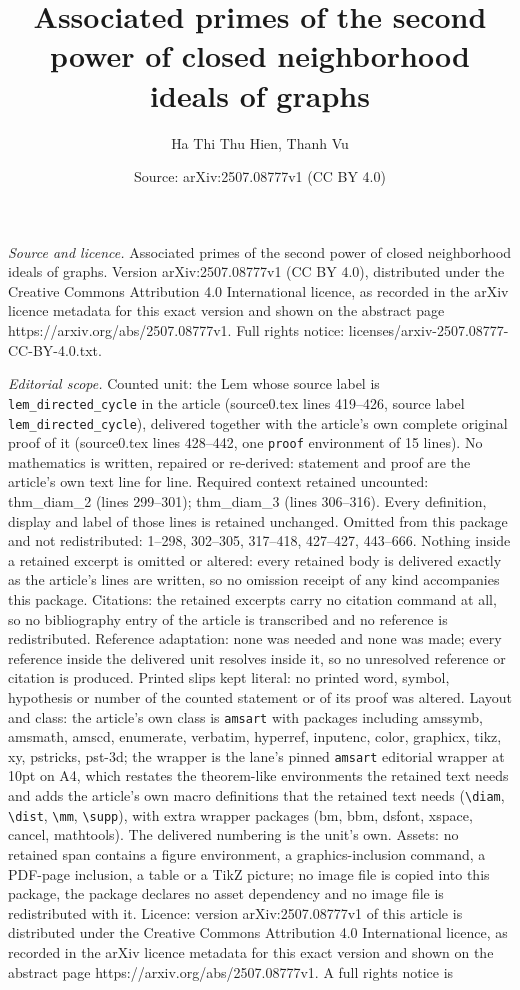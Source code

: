\documentclass[10pt,a4paper]{amsart}
\title[Associated primes of the second power of closed neighborhood]{Associated primes of the second power of closed neighborhood ideals of graphs}
\author{Ha Thi Thu Hien, Thanh Vu}
\date{Source: arXiv:2507.08777v1 (CC BY 4.0)}
\begin{document}
\maketitle

\noindent\emph{Source and licence.} Associated primes of the second power of closed neighborhood ideals of graphs. Version arXiv:2507.08777v1 (CC BY 4.0), distributed under the Creative Commons Attribution 4.0 International licence, as recorded in the arXiv licence metadata for this exact version and shown on the abstract page https://arxiv.org/abs/2507.08777v1. Full rights notice: licenses/arxiv-2507.08777-CC-BY-4.0.txt.\par\smallskip

\noindent\textit{Editorial scope.} Counted unit: the Lem whose source label is \texttt{lem\_directed\_cycle} in the article (source0.tex lines 419--426, source label \texttt{lem\_directed\_cycle}), delivered together with the article's own complete original proof of it (source0.tex lines 428--442, one \texttt{proof} environment of 15 lines). No mathematics is written, repaired or re-derived: statement and proof are the article's own text line for line. Required context retained uncounted: thm\_diam\_2 (lines 299--301); thm\_diam\_3 (lines 306--316). Every definition, display and label of those lines is retained unchanged. Omitted from this package and not redistributed: 1--298, 302--305, 317--418, 427--427, 443--666. Nothing inside a retained excerpt is omitted or altered: every retained body is delivered exactly as the article's lines are written, so no omission receipt of any kind accompanies this package. Citations: the retained excerpts carry no citation command at all, so no bibliography entry of the article is transcribed and no reference is redistributed. Reference adaptation: none was needed and none was made; every reference inside the delivered unit resolves inside it, so no unresolved reference or citation is produced. Printed slips kept literal: no printed word, symbol, hypothesis or number of the counted statement or of its proof was altered. Layout and class: the article's own class is \texttt{amsart} with packages including amssymb, amsmath, amscd, enumerate, verbatim, hyperref, inputenc, color, graphicx, tikz, xy, pstricks, pst-3d; the wrapper is the lane's pinned \texttt{amsart} editorial wrapper at 10pt on A4, which restates the theorem-like environments the retained text needs and adds the article's own macro definitions that the retained text needs (\texttt{\textbackslash diam}, \texttt{\textbackslash dist}, \texttt{\textbackslash mm}, \texttt{\textbackslash supp}), with extra wrapper packages (bm, bbm, dsfont, xspace, cancel, mathtools). The delivered numbering is the unit's own. Assets: no retained span contains a figure environment, a graphics-inclusion command, a PDF-page inclusion, a table or a TikZ picture; no image file is copied into this package, the package declares no asset dependency and no image file is redistributed with it. Licence: version arXiv:2507.08777v1 of this article is distributed under the Creative Commons Attribution 4.0 International licence, as recorded in the arXiv licence metadata for this exact version and shown on the abstract page https://arxiv.org/abs/2507.08777v1. A full rights notice is 
\end{document}
